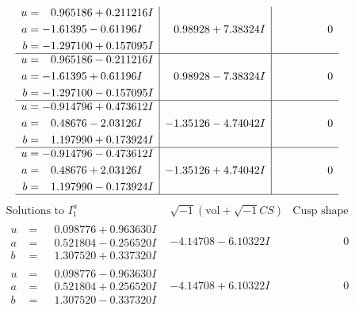 \documentclass[1p]{elsarticle_modified}
\theoremstyle{definition}
\newcommand{\I}{\sqrt{-1}}
\begin{document}
$$\begin{array}{c|c|c}
\begin{aligned}
u &= \phantom{-}0.965186 + 0.211216 I \\
a &= -1.61395 - 0.61196 I \\
b &= -1.297100 + 0.157095 I\end{aligned}
 & \phantom{-}0.98928 + 7.38324 I & \phantom{-0.000000 } 0 \\ \hline\begin{aligned}
u &= \phantom{-}0.965186 - 0.211216 I \\
a &= -1.61395 + 0.61196 I \\
b &= -1.297100 - 0.157095 I\end{aligned}
 & \phantom{-}0.98928 - 7.38324 I & \phantom{-0.000000 } 0 \\ \hline\begin{aligned}
u &= -0.914796 + 0.473612 I \\
a &= \phantom{-}0.48676 - 2.03126 I \\
b &= \phantom{-}1.197990 + 0.173924 I\end{aligned}
 & -1.35126 - 4.74042 I & \phantom{-0.000000 } 0 \\ \hline\begin{aligned}
u &= -0.914796 - 0.473612 I \\
a &= \phantom{-}0.48676 + 2.03126 I \\
b &= \phantom{-}1.197990 - 0.173924 I\end{aligned}
 & -1.35126 + 4.74042 I & \phantom{-0.000000 } 0\\
 \hline 
 \end{array}$$\newpage$$\begin{array}{c|c|c}  
\text{Solutions to }I^u_{1}& \I (\text{vol} + \sqrt{-1}CS) & \text{Cusp shape}\\
 \hline 
\begin{aligned}
u &= \phantom{-}0.098776 + 0.963630 I \\
a &= \phantom{-}0.521804 - 0.256520 I \\
b &= \phantom{-}1.307520 + 0.337320 I\end{aligned}
 & -4.14708 - 6.10322 I & \phantom{-0.000000 } 0 \\ \hline\begin{aligned}
u &= \phantom{-}0.098776 - 0.963630 I \\
a &= \phantom{-}0.521804 + 0.256520 I \\
b &= \phantom{-}1.307520 - 0.337320 I\end{aligned}
 & -4.14708 + 6.10322 I & \phantom{-0.000000 } 0 \\ \hline\begin{aligned}

\end{aligned}
\end{array}$$
\end{document}
